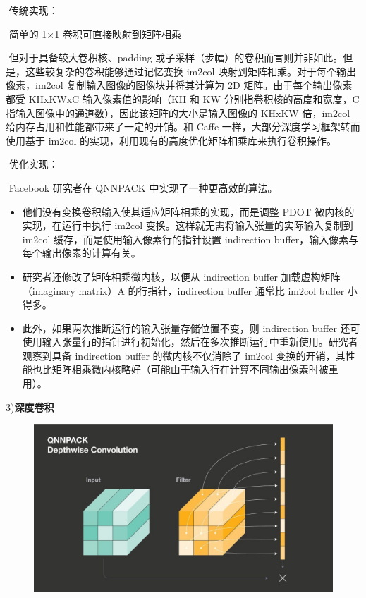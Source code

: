 ​ 传统实现：

​ 简单的 1×1 卷积可直接映射到矩阵相乘

​ 但对于具备较大卷积核、padding
或子采样（步幅）的卷积而言则并非如此。但是，这些较复杂的卷积能够通过记忆变换
im2col 映射到矩阵相乘。对于每个输出像素，im2col
复制输入图像的图像块并将其计算为 2D 矩阵。由于每个输出像素都受 KHxKWxC
输入像素值的影响（KH 和 KW 分别指卷积核的高度和宽度，C
指输入图像中的通道数），因此该矩阵的大小是输入图像的 KHxKW 倍，im2col
给内存占用和性能都带来了一定的开销。和 Caffe
一样，大部分深度学习框架转而使用基于 im2col
的实现，利用现有的高度优化矩阵相乘库来执行卷积操作。

​ 优化实现：

​ Facebook 研究者在 QNNPACK 中实现了一种更高效的算法。

\begin{itemize}
\item
  他们没有变换卷积输入使其适应矩阵相乘的实现，而是调整 PDOT
  微内核的实现，在运行中执行 im2col
  变换。这样就无需将输入张量的实际输入复制到 im2col
  缓存，而是使用输入像素行的指针设置 indirection
  buffer，输入像素与每个输出像素的计算有关。
\item
  研究者还修改了矩阵相乘微内核，以便从 indirection buffer
  加载虚构矩阵（imaginary matrix）A 的行指针，indirection buffer 通常比
  im2col buffer 小得多。
\item
  此外，如果两次推断运行的输入张量存储位置不变，则 indirection buffer
  还可使用输入张量行的指针进行初始化，然后在多次推断运行中重新使用。研究者观察到具备
  indirection buffer 的微内核不仅消除了 im2col
  变换的开销，其性能也比矩阵相乘微内核略好（可能由于输入行在计算不同输出像素时被重用）。
\end{itemize}

3)\textbf{深度卷积}

\begin{figure}
\centering
\includegraphics{./img/ch17/QNNPACK4.jpeg}
\caption{}
\end{figure}

